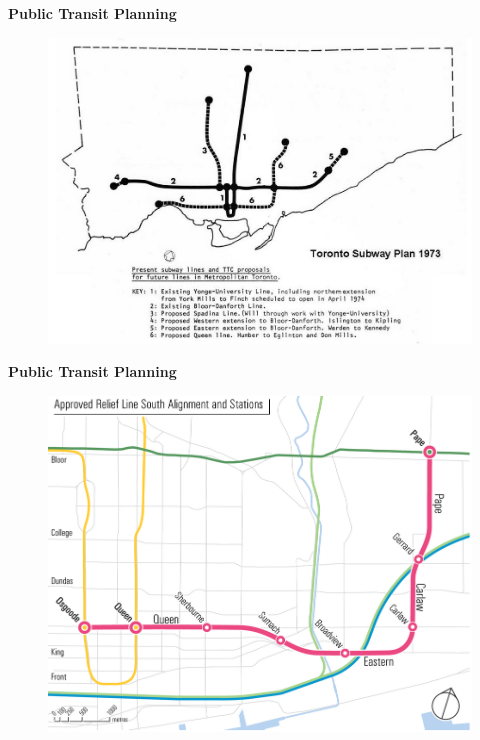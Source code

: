 \documentclass[aspectratio=169]{beamer}
\begin{document}
\begin{frame}
	
	\textbf{Public Transit Planning}
	
	
	
	\begin{figure}
		\centering
		\includegraphics[width=0.8\linewidth]{images/toronto_plan_1973.png}
	\end{figure}
	
	
\end{frame}



\begin{frame}
	
	\textbf{Public Transit Planning}
	
	
	
	\begin{figure}
		\centering
		\includegraphics[width=0.8\linewidth]{images/toronto_plan_2019.png}
	\end{figure}
	
	
\end{frame}
\end{document}

